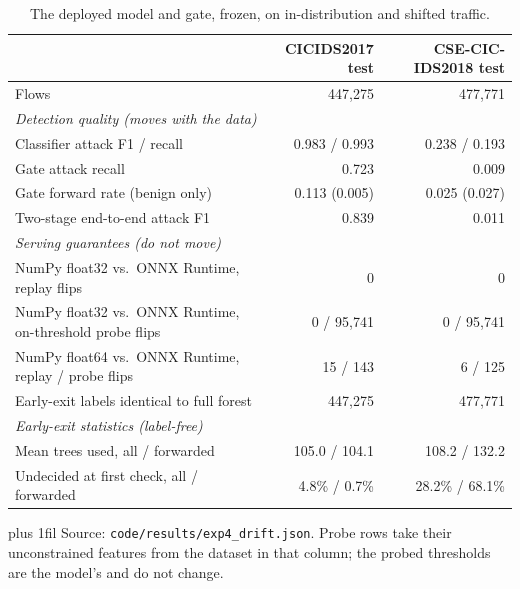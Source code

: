 \documentclass[runningheads]{llncs}
\newcommand{\tabnote}[1]{%
  \vspace{4pt}\par\noindent
  \begin{minipage}{\textwidth}%
    \footnotesize\parindent=0pt\leftskip=0pt\rightskip=0pt\parfillskip=0pt plus 1fil\relax
    #1%
  \end{minipage}}
\begin{document}
\begin{table}[htbp]
  \caption{The deployed model and gate, frozen, on in-distribution and shifted traffic.}
  \label{tab:drift}
  \centering
  \small
  \begin{tabular}{l r r}
    \toprule
     & CICIDS2017 test & CSE-CIC-IDS2018 test \\
    \midrule
    Flows                                         & 447{,}275 & 477{,}771 \\
    \multicolumn{3}{l}{\emph{Detection quality (moves with the data)}} \\
    \quad Classifier attack F1 / recall           & 0.983 / 0.993 & 0.238 / 0.193 \\
    \quad Gate attack recall                      & 0.723 & 0.009 \\
    \quad Gate forward rate (benign only)         & 0.113 (0.005) & 0.025 (0.027) \\
    \quad Two-stage end-to-end attack F1          & 0.839 & 0.011 \\
    \multicolumn{3}{l}{\emph{Serving guarantees (do not move)}} \\
    \quad NumPy float32 vs.\ ONNX Runtime, replay flips  & 0 & 0 \\
    \quad NumPy float32 vs.\ ONNX Runtime, on-threshold probe flips & 0 / 95{,}741 & 0 / 95{,}741 \\
    \quad NumPy float64 vs.\ ONNX Runtime, replay / probe flips & 15 / 143 & 6 / 125 \\
    \quad Early-exit labels identical to full forest & 447{,}275 & 477{,}771 \\
    \multicolumn{3}{l}{\emph{Early-exit statistics (label-free)}} \\
    \quad Mean trees used, all / forwarded        & 105.0 / 104.1 & 108.2 / 132.2 \\
    \quad Undecided at first check, all / forwarded & 4.8\% / 0.7\% & 28.2\% / 68.1\% \\
    \bottomrule
  \end{tabular}
  \tabnote{Source: \texttt{code/results/exp4\_drift.json}. Probe rows take their unconstrained features from the dataset in that column; the probed thresholds are the model's and do not change.}
\end{table}
\end{document}
